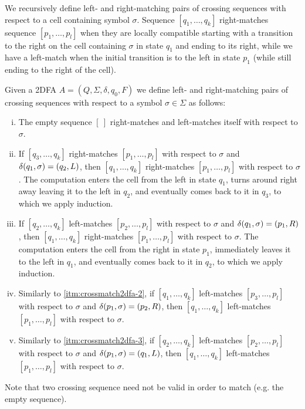 We recursively define left- and right-matching pairs of crossing sequences with respect to a cell containing symbol $\sigma$.
Sequence $[q_1,\dots,q_k]$ right-matches sequence $[p_1,\dots,p_l]$ when they are locally compatible starting with a transition to the right on the cell containing $\sigma$ in state $q_1$ and ending to its right, while we have a left-match when the initial transition is to the left in state $p_1$ (while still ending to the right of the cell).

\begin{defn}
	Given a 2DFA $A=(Q,\Sigma,\delta,q_0,F)$ we define left- and right-matching pairs of crossing sequences with respect to a symbol $\sigma\in\Sigma$ as follows:
	\begin{enumerate}[i.]
		\item The empty sequence $[~]$ right-matches and left-matches itself with respect to $\sigma$.
		\item \label{itm:crossmatch2dfa-2} If $[q_3,\dots,q_k]$ right-matches $[p_1,\dots,p_l]$ with respect to $\sigma$ and $\delta(q_1,\sigma)=(q_2,L)$, then $[q_1,\dots,q_k]$ right-matches $[p_1,\dots,p_l]$ with respect to $\sigma$. The computation enters the cell from the left in state $q_1$, turns around right away leaving it to the left in $q_2$, and eventually comes back to it in $q_3$, to which we apply induction.
		\item \label{itm:crossmatch2dfa-3} If $[q_2,\dots,q_k]$ left-matches $[p_2,\dots,p_l]$ with respect to $\sigma$ and $\delta(q_1,\sigma)=(p_1,R)$, then $[q_1,\dots,q_k]$ right-matches $[p_1,\dots,p_l]$ with respect to $\sigma$. The computation enters the cell from the right in state $p_1$, immediately leaves it to the left in $q_1$, and eventually comes back to it in $q_2$, to which we apply induction.
		\item Similarly to \ref{itm:crossmatch2dfa-2}, if $[q_1,\dots,q_k]$ left-matches $[p_3,\dots,p_l]$ with respect to $\sigma$ and $\delta(p_1,\sigma)=(p_2,R)$, then $[q_1,\dots,q_k]$ left-matches $[p_1,\dots,p_l]$ with respect to $\sigma$.
		\item Similarly to \ref{itm:crossmatch2dfa-3}, if $[q_2,\dots,q_k]$ left-matches $[p_2,\dots,p_l]$ with respect to $\sigma$ and $\delta(p_1,\sigma)=(q_1,L)$, then $[q_1,\dots,q_k]$ left-matches $[p_1,\dots,p_l]$ with respect to $\sigma$.
	\end{enumerate}
\end{defn}
Note that two crossing sequence need not be valid in order to match (e.g. the empty sequence).

